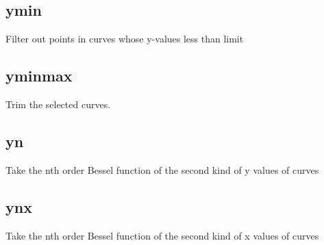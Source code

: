 \documentclass[letterpaper,10pt,english]{sphinxmanual}
\begin{document}
\subsection{ymin}
\label{\detokenize{math_operations:ymin}}
Filter out points in curves whose y-values less than limit

\begin{sphinxVerbatim}[commandchars=\\\{\}]
\PYG{p}{[}\PYG{p}{]}   
\end{sphinxVerbatim}


\subsection{yminmax}
\label{\detokenize{math_operations:yminmax}}
Trim the selected curves. 

\begin{sphinxVerbatim}[commandchars=\\\{\}]
\PYG{p}{[}\PYG{p}{]}    
\end{sphinxVerbatim}


\subsection{yn}
\label{\detokenize{math_operations:yn}}
Take the nth order Bessel function of the second kind of y values of curves

\begin{sphinxVerbatim}[commandchars=\\\{\}]
\PYG{p}{[}\PYG{p}{]}   
\end{sphinxVerbatim}


\subsection{ynx}
\label{\detokenize{math_operations:ynx}}
Take the nth order Bessel function of the second kind of x values of curves
\end{document}
